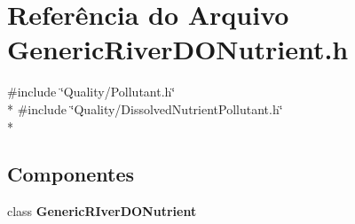 \section{Referência do Arquivo Generic\+River\+D\+O\+Nutrient.\+h}
\label{_generic_river_w_q_model_2_generic_r_iver_d_o_nutrient_8h}
{\ttfamily \#include \char`\"{}Quality/\+Pollutant.\+h\char`\"{}}\\*
{\ttfamily \#include \char`\"{}Quality/\+Dissolved\+Nutrient\+Pollutant.\+h\char`\"{}}\\*
\subsection*{Componentes}
\begin{DoxyCompactItemize}
\item 
class {\bf Generic\+R\+Iver\+D\+O\+Nutrient}
\end{DoxyCompactItemize}
